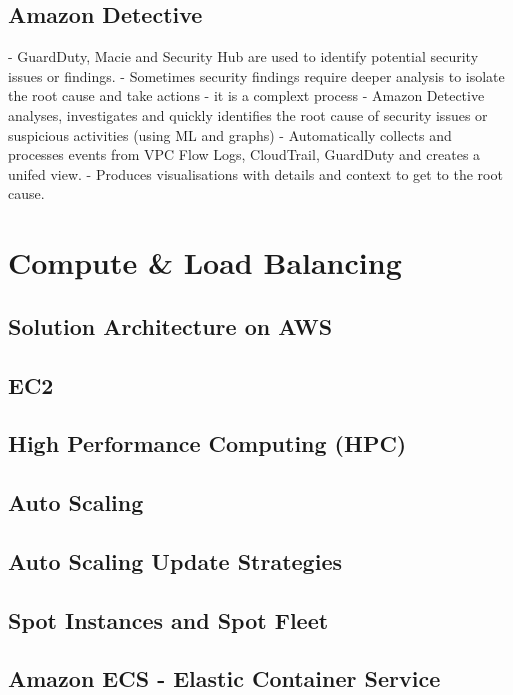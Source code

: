 \documentclass[11pt]{book}
\begin{document}
    \section{Amazon Detective}
    - GuardDuty, Macie and Security Hub are used to identify potential security issues or findings.
    - Sometimes security findings require deeper analysis to isolate the root cause and take actions - it is a complext process
    - Amazon Detective analyses, investigates and quickly identifies the root cause of security issues or suspicious activities (using ML and graphs)
    - Automatically collects and processes events from VPC Flow Logs, CloudTrail, GuardDuty and creates a unifed view.
    - Produces visualisations with details and context to get to the root cause.

    \chapter{Compute \& Load Balancing}


    \section{Solution Architecture on AWS}


    \section{EC2}


    \section{High Performance Computing (HPC)}


    \section{Auto Scaling}


    \section{Auto Scaling Update Strategies}


    \section{Spot Instances and Spot Fleet}


    \section{Amazon ECS - Elastic Container Service}
\end{document}

